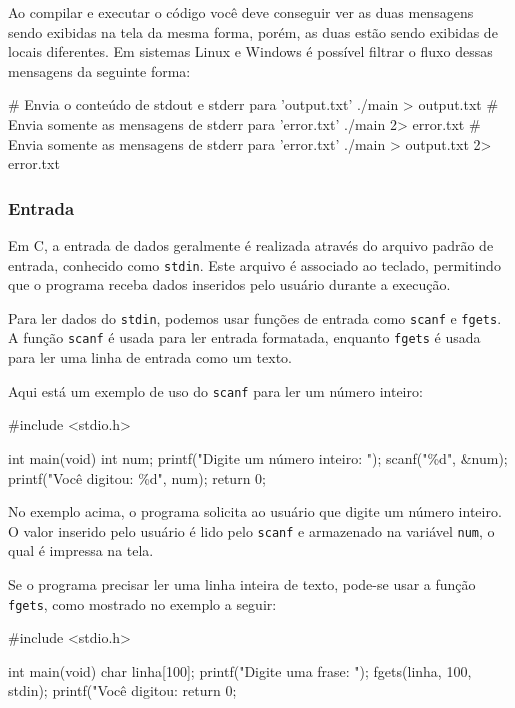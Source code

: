 Ao compilar e executar o código você deve conseguir ver as duas mensagens 
sendo exibidas na tela da mesma forma, porém, as duas estão sendo exibidas de 
locais diferentes. Em sistemas Linux e Windows é possível filtrar o fluxo 
dessas mensagens da seguinte forma:

\begin{textbox}
    # Envia o conteúdo de stdout e stderr para 'output.txt'
    ./main > output.txt
    # Envia somente as mensagens de stderr para 'error.txt'
    ./main 2> error.txt
    # Envia somente as mensagens de stderr para 'error.txt'
    ./main > output.txt 2> error.txt
\end{textbox}

\subsubsection{Entrada}

Em C, a entrada de dados geralmente é realizada através do arquivo padrão de 
entrada, conhecido como \texttt{stdin}. Este arquivo é associado ao 
teclado, permitindo que o programa receba dados inseridos pelo usuário durante 
a execução.

Para ler dados do \texttt{stdin}, podemos usar funções de entrada como 
\texttt{scanf} e \texttt{fgets}. A função \texttt{scanf} é usada para ler 
entrada formatada, enquanto \texttt{fgets} é usada para ler uma linha de 
entrada como um texto.

Aqui está um exemplo de uso do \texttt{scanf} para ler um número inteiro:

\begin{excode}
    #include <stdio.h>

    int main(void)
    {
        int num;
        printf("Digite um número inteiro: ");
        scanf("\%d", &num);
        printf("Você digitou: \%d\n", num);
        return 0;
    }
\end{excode}

No exemplo acima, o programa solicita ao usuário que digite um número inteiro. 
O valor inserido pelo usuário é lido pelo \texttt{scanf} e armazenado na variável 
\texttt{num}, o qual é impressa na tela.

Se o programa precisar ler uma linha inteira de texto, pode-se usar a função 
\texttt{fgets}, como mostrado no exemplo a seguir:

\begin{excode}
    #include <stdio.h>

    int main(void)
    {
        char linha[100];
        printf("Digite uma frase: ");
        fgets(linha, 100, stdin);
        printf("Você digitou: %
        return 0;
    }
\end{excode}

